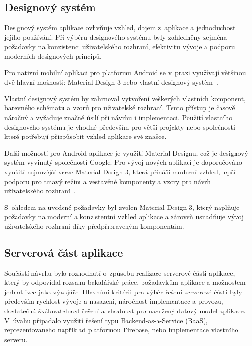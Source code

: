 \subsection{Designový systém}
Designový systém aplikace ovlivňuje vzhled, dojem z~aplikace a jednoduchost jejího používání.
Při výběru designového systému byly zohledněny zejména požadavky na konzistenci uživatelského rozhraní, efektivitu vývoje a podporu moderních designových principů.

Pro nativní mobilní aplikaci pro platformu Android se v~praxi využívají většinou dvě hlavní možnosti: Material Design 3 nebo vlastní designový systém~\parencite{android_design_system_options}.

Vlastní designový systém by zahrnoval vytvoření veškerých vlastních komponent, barevného schématu a vzorů pro uživatelské rozhraní.
Tento přístup je časově náročný a vyžaduje značné úsilí při návrhu i implementaci.
Použití vlastního designového systému je vhodné především pro větší projekty nebo společnosti, které potřebují přizpůsobit vzhled aplikace své značce.

Další možností pro Android aplikace je využití Material Designu, což je designový systém vyvinutý společností Google.
Pro vývoj nových aplikací je doporučováno využití nejnovější verze Material Design 3, která přináší moderní vzhled, lepší podporu pro tmavý režim a vestavěné komponenty a vzory pro návrh uživatelského rozhraní~\parencite{material_design_3_recommendation}.

S~ohledem na uvedené požadavky byl zvolen Material Design 3, který naplňuje požadavky na moderní a konzistentní vzhled aplikace a zároveň usnadňuje vývoj uživatelského rozhraní díky předpřipraveným komponentám.

\subsection{Serverová část aplikace}\label{subsec:backend-solution}
Součástí návrhu bylo rozhodnutí o~způsobu realizace serverové části aplikace, který by odpovídal rozsahu bakalářské práce, požadavkům aplikace a možnostem jednotlivce jako vývojáře.
Hlavními kritérii pro výběr řešení serverové části byly především rychlost vývoje a nasazení, náročnost implementace a provozu, dostatečná škálovatelnost řešení a vhodnost pro navržený datový model aplikace.
V~úvahu připadalo využití řešení typu Backend-as-a-Service (BaaS), reprezentovaného například platformou Firebase, nebo implementace vlastního serveru.

